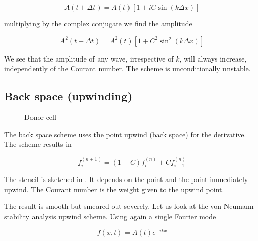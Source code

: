 \begin{equation}
A(t+\Delta t) = A(t)\left[1 + i C \sin \left(k\Delta x\right)\right]
\end{equation}

multiplying by the complex conjugate we find the amplitude

\begin{equation}
A^2(t+\Delta t) = A^2(t)\left[1 + C^2 \sin^2\left(k\Delta x\right)\right]
\end{equation}

We see that the amplitude of any wave, irrespective of $k$, will always increase, independently of the Courant number. The scheme is unconditionally unstable. 

\subsection{Back space (upwinding)}

\begin{figure}
  \begin{center}
  \end{center}
  \caption[]{Donor cell}
  \label{fig:donor}
\end{figure}

The back space scheme uses the point upwind
(back space) for the derivative. The scheme results in 

\begin{equation}
f^{(n+1)}_i  = (1-C) f^{(n)}_i + Cf^{(n)}_{i-1}
\end{equation}

The stencil is sketched in . It depends on the point and the point immediately upwind. The Courant number is the weight given to the upwind point. 

The result is smooth but smeared out severely. Let us look at the von Neumann stability analysis upwind scheme. Using again a single Fourier mode 


\begin{equation}
f(x,t) = A(t) e^{-ikx}
\end{equation}

